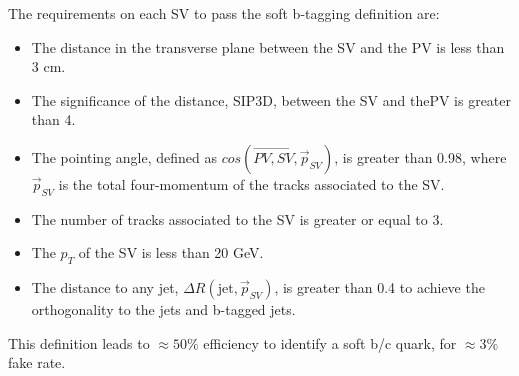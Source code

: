 The requirements on each SV to pass the soft b-tagging definition are:
\begin{itemize}
	 \item The distance in the transverse plane between the SV and the PV is less than 3 cm.
	 \item The significance of the distance, SIP3D, between the SV and thePV is greater than 4.
	 \item The pointing angle, defined as $cos(\overrightarrow{PV,SV},\overrightarrow{p}_{SV})$, is greater than 0.98, where $\overrightarrow{p}_{SV}$ is the total four-momentum of the tracks associated to the SV. 
	 \item The number of tracks associated to the SV is greater or equal to 3.
	 \item The $p_T$ of the SV is less than 20 GeV.
	 \item The distance to any jet, $\Delta R(\text{jet},\overrightarrow{p}_{SV})$, is greater than 0.4 to achieve the orthogonality to the jets and b-tagged jets.
 \end{itemize}
 
 This definition leads to $\approx 50 \%$ efficiency to identify a soft b/c quark, for $\approx3\%$ fake rate.

